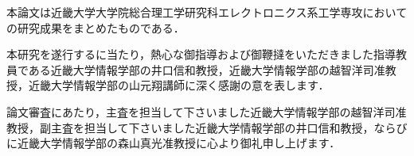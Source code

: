 本論文は近畿大学大学院総合理工学研究科エレクトロニクス系工学専攻においての研究成果をまとめたものである．

本研究を遂行するに当たり，熱心な御指導および御鞭撻をいただきました指導教員である近畿大学情報学部の井口信和教授，近畿大学情報学部の越智洋司准教授，近畿大学情報学部の山元翔講師に深く感謝の意を表します．

論文審査にあたり，主査を担当して下さいました近畿大学情報学部の越智洋司准教授，副主査を担当して下さいました近畿大学情報学部の井口信和教授，ならびに近畿大学情報学部の森山真光准教授に心より御礼申し上げます．